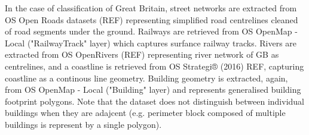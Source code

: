 In the case of classification of Great Britain, street networks are extracted from OS
Open Roads datasets (REF) representing simplified road centrelines cleaned of road
segments under the ground. Railways are retrieved from OS OpenMap - Local
("RailwayTrack" layer) which captures surfance railway tracks. Rivers are extracted from
OS OpenRivers (REF) representing river network of GB as centrelines, and a coastline is
retrieved from OS Strategi® (2016) REF, capturing  coastline as a continous line
geometry. Building geometry is extracted, again, from OS OpenMap - Local ("Building"
layer) and represents generalised building footprint polygons. Note that the dataset
does not distinguish between individual buildings when they are adajcent (e.g. perimeter
block composed of multiple buildings is represent by a single polygon).











